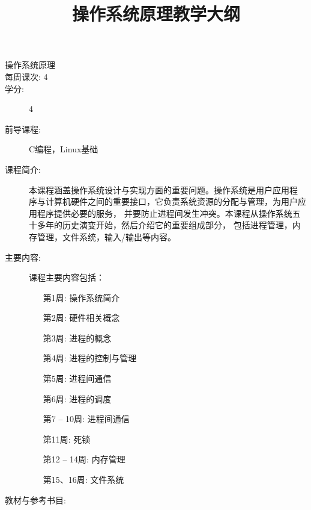 \documentclass{wx672article} %
\title{操作系统原理教学大纲}
\author{}\date{}
\begin{document}
\begin{description}
\item[操作系统原理]
\item[每周课次: 4]
\item[学分:] 4
\item[前导课程:] C编程，Linux基础
\item[课程简介:] 本课程涵盖操作系统设计与实现方面的重要问题。操作系统是用户应用程
  序与计算机硬件之间的重要接口，它负责系统资源的分配与管理，为用户应用程序提供必要的服务，
  并要防止进程间发生冲突。本课程从操作系统五十多年的历史演变开始，然后介绍它的重要组成部分，
  包括进程管理，内存管理，文件系统，输入/输出等内容。
\item[主要内容:] 课程主要内容包括：
  \begin{itemize}
  \item[第1周:] 操作系统简介
  \item[第2周:] 硬件相关概念
  \item[第3周:] 进程的概念
  \item[第4周:] 进程的控制与管理
  \item[第5周:] 进程间通信
  \item[第6周:] 进程的调度
  \item[第7 -- 10周:] 进程间通信
  \item[第11周:] 死锁
  \item[第12 -- 14周:] 内存管理
  \item[第15、16周:] 文件系统
  \end{itemize}
\item[教材与参考书目:]\hfill
  \nocite{silberschatz11essentials,tanenbaum2008modern,bovet2005understanding}
  \printbibliography[heading=none]{}
\end{description}
\end{document}
